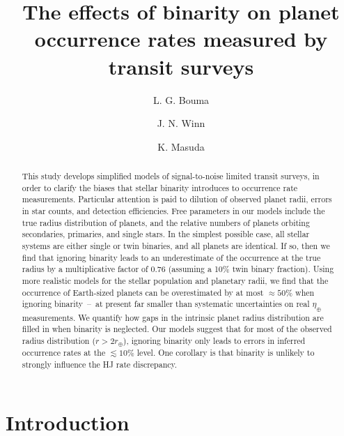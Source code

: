 \documentclass[12pt,modern]{aastex61}
\begin{document}
    
\title{ The effects of binarity on planet occurrence rates measured by transit 
surveys}
%
%
\author{L. G. Bouma}
\author{J. N. Winn}
\author{K. Masuda}
%
%
\begin{abstract}
%
This study develops simplified models of signal-to-noise limited transit 
surveys, in order to clarify the biases that stellar binarity introduces
to occurrence rate measurements.
Particular attention is paid to dilution of observed planet radii, errors in 
star counts, and detection efficiencies.
Free parameters in our models include the true radius distribution of planets, 
and the relative numbers of planets orbiting secondaries, primaries, and 
single stars.
In the simplest possible case, all stellar systems are either single or twin 
binaries, and all planets are identical. If so, then we find that ignoring 
binarity leads to an underestimate of the occurrence at the true radius by a 
multiplicative factor of $0.76$ (assuming a 10\% twin binary fraction).
Using more realistic models for the stellar population and planetary 
radii, we find that the occurrence of Earth-sized planets can be overestimated 
by at most $\approx 50\%$ when ignoring binarity~--~at present far smaller 
than systematic uncertainties on real $\eta_\oplus$ measurements.
We quantify how gaps in the intrinsic planet radius distribution are filled 
in when binarity is neglected.
Our models suggest that for most of the observed radius distribution 
($r>2r_\oplus$), ignoring binarity only leads to errors in inferred occurrence 
rates at the $\lesssim 10\%$ level.
One corollary is that binarity is unlikely to strongly influence the HJ rate 
discrepancy.
%
\end{abstract}
%
%
%

%

\section{Introduction}
\end{document}
